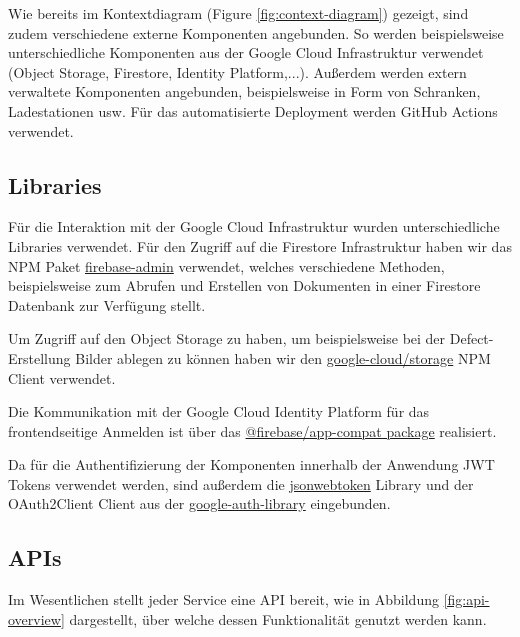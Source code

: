 Wie bereits im Kontextdiagram (Figure \ref{fig:context-diagram}) gezeigt, sind zudem verschiedene externe Komponenten angebunden. So werden beispielsweise unterschiedliche Komponenten aus der Google Cloud Infrastruktur verwendet (Object Storage, Firestore, Identity Platform,...). Außerdem werden extern verwaltete Komponenten angebunden, beispielsweise in Form von Schranken, Ladestationen usw. Für das automatisierte Deployment werden GitHub Actions verwendet.

\subsection{Libraries}
Für die Interaktion mit der Google Cloud Infrastruktur wurden unterschiedliche Libraries verwendet. Für den Zugriff auf die Firestore Infrastruktur haben wir das NPM Paket \href{hhttps://www.npmjs.com/package/firebase-admin}{firebase-admin} verwendet, welches verschiedene Methoden, beispielsweise zum Abrufen und Erstellen von Dokumenten in einer Firestore Datenbank zur Verfügung stellt.

Um Zugriff auf den Object Storage zu haben, um beispielsweise bei der Defect-Erstellung Bilder ablegen zu können haben wir den \href{https://www.npmjs.com/package/@google-cloud/storage}{google-cloud/storage} NPM Client verwendet.

Die Kommunikation mit der Google Cloud Identity Platform für das frontendseitige Anmelden ist über das \href{https://www.npmjs.com/package/@firebase/app-compat}{@firebase/app-compat package} realisiert.

Da für die Authentifizierung der Komponenten innerhalb der Anwendung JWT Tokens verwendet werden, sind außerdem die \href{https://www.npmjs.com/package/jsonwebtoken}{jsonwebtoken} Library und der OAuth2Client Client aus der \href{https://www.npmjs.com/package/google-auth-library}{google-auth-library} eingebunden.

\subsection{APIs}
Im Wesentlichen stellt jeder Service eine API bereit, wie in Abbildung \ref{fig:api-overview} dargestellt, über welche dessen Funktionalität genutzt werden kann.

